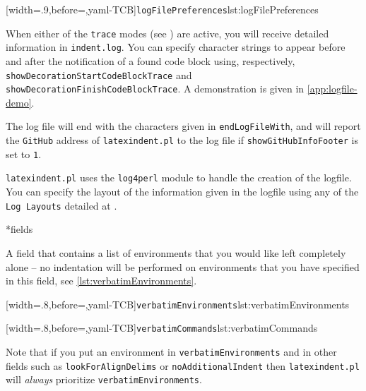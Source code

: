 	[width=.9\linewidth,before=\centering,yaml-TCB]{\texttt{logFilePreferences}}{lst:logFilePreferences}

	When%
	 either of the \texttt{trace} modes (see ) are active, you will receive detailed information in \texttt{indent.log}.
	You can specify character strings to appear before and after the notification of a found code block using, respectively, \texttt{showDecorationStartCodeBlockTrace} and \texttt{showDecorationFinishCodeBlockTrace}.
	A demonstration is given in \vref{app:logfile-demo}.

	The log file will end with the characters given in \texttt{endLogFileWith}, and will report the \texttt{GitHub} address of \texttt{latexindent.pl} to the log file if \texttt{showGitHubInfoFooter} is set to \texttt{1}.

	\texttt{latexindent.pl}%
	 uses the \texttt{log4perl} module \cite{log4perl} to handle the creation of the logfile.
	You can specify the layout of the information given in the logfile using any of the \texttt{Log Layouts} detailed at \cite{log4perl}.

*{fields}

	A field that contains a list of environments that you would like left completely alone -- no indentation will be performed on environments that you have specified in this field, see \cref{lst:verbatimEnvironments}.

	\begin{minipage}{.45\textwidth}
		[width=.8\linewidth,before=\centering,yaml-TCB]{\texttt{verbatimEnvironments}}{lst:verbatimEnvironments}
	\end{minipage}%
	\hfill
	\begin{minipage}{.45\textwidth}
		[width=.8\linewidth,before=\centering,yaml-TCB]{\texttt{verbatimCommands}}{lst:verbatimCommands}
	\end{minipage}%

	Note that if  you put an environment in  \texttt{verbatimEnvironments} and in other fields such as \texttt{lookForAlignDelims} or \texttt{noAdditionalIndent} then \texttt{latexindent.pl} will \emph{always} prioritize  \texttt{verbatimEnvironments}.

